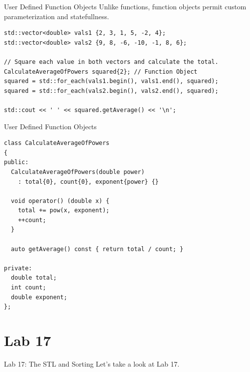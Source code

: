 \documentclass[14pt,aspectratio=1610]{beamer}
\begin{document}
\begin{frame}[fragile]{User Defined Function Objects}
Unlike functions, function objects permit custom parameterization and statefullness.

\begin{lstlisting}[basicstyle=\footnotesize\ttfamily]
std::vector<double> vals1 {2, 3, 1, 5, -2, 4};
std::vector<double> vals2 {9, 8, -6, -10, -1, 8, 6};

// Square each value in both vectors and calculate the total.
CalculateAverageOfPowers squared{2}; // Function Object
squared = std::for_each(vals1.begin(), vals1.end(), squared);
squared = std::for_each(vals2.begin(), vals2.end(), squared);

std::cout << ' ' << squared.getAverage() << '\n';
\end{lstlisting}
\end{frame}

\begin{frame}[fragile]{User Defined Function Objects}
\begin{lstlisting}[basicstyle=\footnotesize\ttfamily]
class CalculateAverageOfPowers
{
public:
  CalculateAverageOfPowers(double power) 
    : total{0}, count{0}, exponent{power} {}

  void operator() (double x) {
    total += pow(x, exponent);
    ++count;
  }

  auto getAverage() const { return total / count; }

private:
  double total;
  int count;
  double exponent;
};
\end{lstlisting}
\end{frame}

\section*{Lab 17}
\begin{frame}{Lab 17: The STL and Sorting}
\centering\Large
  Let's take a look at Lab 17.
\end{frame}
\end{document}
